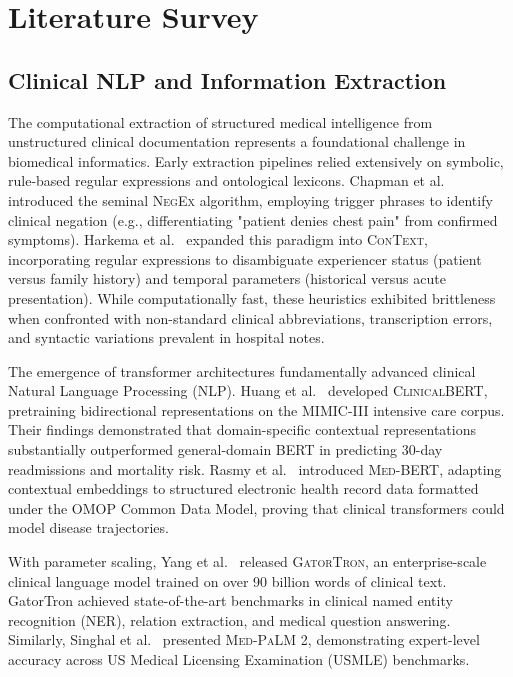 \chapter{Literature Survey}
\label{chap:literature_survey}

\section{Clinical NLP and Information Extraction}
\label{sec:lit_clinical_nlp}

The computational extraction of structured medical intelligence from unstructured clinical documentation represents a foundational challenge in biomedical informatics. Early extraction pipelines relied extensively on symbolic, rule-based regular expressions and ontological lexicons. Chapman et al.~\cite{chapman2001negex} introduced the seminal \textsc{NegEx} algorithm, employing trigger phrases to identify clinical negation (e.g., differentiating "patient denies chest pain" from confirmed symptoms). Harkema et al.~\cite{harkema2009context} expanded this paradigm into \textsc{ConText}, incorporating regular expressions to disambiguate experiencer status (patient versus family history) and temporal parameters (historical versus acute presentation). While computationally fast, these heuristics exhibited brittleness when confronted with non-standard clinical abbreviations, transcription errors, and syntactic variations prevalent in hospital notes.

The emergence of transformer architectures fundamentally advanced clinical Natural Language Processing (NLP). Huang et al.~\cite{huang2019clinicalbert} developed \textsc{ClinicalBERT}, pretraining bidirectional representations on the MIMIC-III intensive care corpus. Their findings demonstrated that domain-specific contextual representations substantially outperformed general-domain BERT in predicting 30-day readmissions and mortality risk. Rasmy et al.~\cite{rasmy2021medbert} introduced \textsc{Med-BERT}, adapting contextual embeddings to structured electronic health record data formatted under the OMOP Common Data Model, proving that clinical transformers could model disease trajectories.

With parameter scaling, Yang et al.~\cite{yang2022gatortron} released \textsc{GatorTron}, an enterprise-scale clinical language model trained on over 90 billion words of clinical text. GatorTron achieved state-of-the-art benchmarks in clinical named entity recognition (NER), relation extraction, and medical question answering. Similarly, Singhal et al.~\cite{singhal2023nature} presented \textsc{Med-PaLM 2}, demonstrating expert-level accuracy across US Medical Licensing Examination (USMLE) benchmarks.

